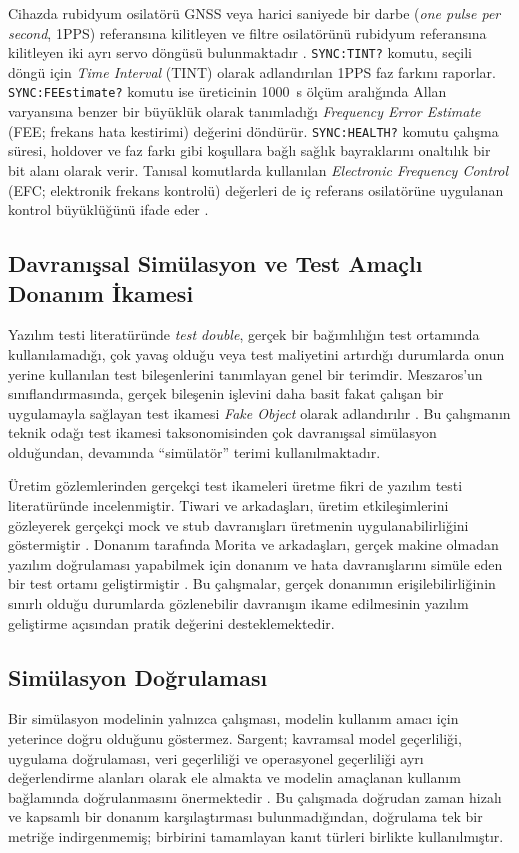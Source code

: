 \documentclass[9pt,twocolumn,a4paper]{extarticle}
\begin{document}
Cihazda rubidyum osilatörü GNSS veya harici saniyede bir darbe (\emph{one pulse per second}, 1PPS) referansına kilitleyen ve filtre osilatörünü rubidyum referansına kilitleyen iki ayrı servo döngüsü bulunmaktadır \cite{jlt2015}. \texttt{SYNC:TINT?} komutu, seçili döngü için \emph{Time Interval} (TINT) olarak adlandırılan 1PPS faz farkını raporlar. \texttt{SYNC:FEEstimate?} komutu ise üreticinin 1000~s ölçüm aralığında Allan varyansına benzer bir büyüklük olarak tanımladığı \emph{Frequency Error Estimate} (FEE; frekans hata kestirimi) değerini döndürür. \texttt{SYNC:HEALTH?} komutu çalışma süresi, holdover ve faz farkı gibi koşullara bağlı sağlık bayraklarını onaltılık bir bit alanı olarak verir. Tanısal komutlarda kullanılan \emph{Electronic Frequency Control} (EFC; elektronik frekans kontrolü) değerleri de iç referans osilatörüne uygulanan kontrol büyüklüğünü ifade eder \cite{jlt2015}.

\subsection{Davranışsal Simülasyon ve Test Amaçlı Donanım İkamesi}
Yazılım testi literatüründe \emph{test double}, gerçek bir bağımlılığın test ortamında kullanılamadığı, çok yavaş olduğu veya test maliyetini artırdığı durumlarda onun yerine kullanılan test bileşenlerini tanımlayan genel bir terimdir. Meszaros'un sınıflandırmasında, gerçek bileşenin işlevini daha basit fakat çalışan bir uygulamayla sağlayan test ikamesi \emph{Fake Object} olarak adlandırılır \cite{meszaros2007}. Bu çalışmanın teknik odağı test ikamesi taksonomisinden çok davranışsal simülasyon olduğundan, devamında ``simülatör'' terimi kullanılmaktadır.

Üretim gözlemlerinden gerçekçi test ikameleri üretme fikri de yazılım testi literatüründe incelenmiştir. Tiwari ve arkadaşları, üretim etkileşimlerini gözleyerek gerçekçi mock ve stub davranışları üretmenin uygulanabilirliğini göstermiştir \cite{tiwari2024}. Donanım tarafında Morita ve arkadaşları, gerçek makine olmadan yazılım doğrulaması yapabilmek için donanım ve hata davranışlarını simüle eden bir test ortamı geliştirmiştir \cite{morita2017}. Bu çalışmalar, gerçek donanımın erişilebilirliğinin sınırlı olduğu durumlarda gözlenebilir davranışın ikame edilmesinin yazılım geliştirme açısından pratik değerini desteklemektedir.

\subsection{Simülasyon Doğrulaması}
Bir simülasyon modelinin yalnızca çalışması, modelin kullanım amacı için yeterince doğru olduğunu göstermez. Sargent; kavramsal model geçerliliği, uygulama doğrulaması, veri geçerliliği ve operasyonel geçerliliği ayrı değerlendirme alanları olarak ele almakta ve modelin amaçlanan kullanım bağlamında doğrulanmasını önermektedir \cite{sargent2013}. Bu çalışmada doğrudan zaman hizalı ve kapsamlı bir donanım karşılaştırması bulunmadığından, doğrulama tek bir metriğe indirgenmemiş; birbirini tamamlayan kanıt türleri birlikte kullanılmıştır.
\end{document}
